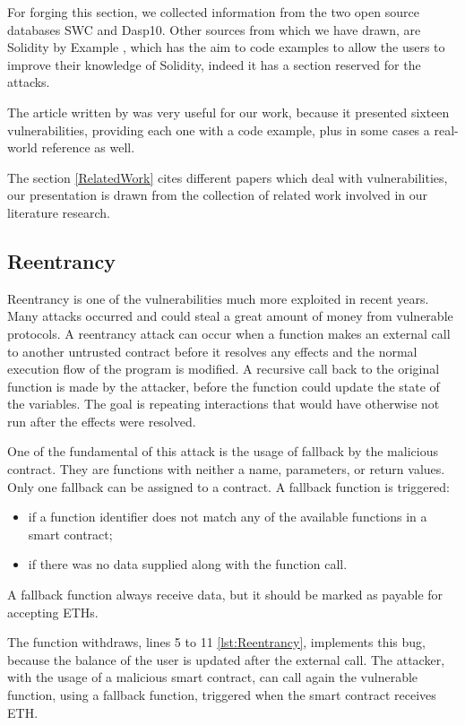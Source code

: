 \documentclass[a4paper,sigconf, language=french,
language=german, language=spanish, language=english]{acmart}
\begin{document}
For forging this section, we collected information from the two open source databases SWC and Dasp10. Other sources from which we have drawn, 
are Solidity by Example \cite{SolidityExamples}, 
which has the aim to code examples to allow the users to improve their knowledge of Solidity, indeed it has a section reserved for the attacks. 

The article written by \citet{VulnMedium} was very useful for our work, because it presented sixteen vulnerabilities, providing each one with a code example, plus in some cases a real-world reference as well.

The section \autoref{RelatedWork} cites different papers which deal with vulnerabilities, our presentation is drawn from the collection of related work involved in our literature research. 

\subsection{Reentrancy} 
Reentrancy is one of the vulnerabilities much more exploited in recent years. 
Many attacks occurred and could steal a great amount of money from vulnerable protocols. 
A reentrancy attack can occur when a function makes an external call to another untrusted contract before it resolves any effects and the normal execution flow of the program is modified.
A recursive call back to the original function is made by the attacker, before 
the function could update the state of the variables. 
The goal is repeating interactions that would have otherwise not run after the effects were resolved. 

One of the fundamental of this attack is the usage of fallback by the malicious contract. 
They are functions with neither a name, parameters, or return values. Only one fallback can be assigned to a contract. 
A fallback function is triggered:
\begin{itemize}
  \item if a function identifier does not match any of the available functions in a smart contract;
  \item if there was no data supplied along with the function call.
\end{itemize}

A fallback function always receive data, but it should be marked as payable for accepting ETHs. 

The function withdraws, lines 5 to 11 \autoref{lst:Reentrancy}, implements this bug, because the balance of the user is updated after the external call. 
The attacker, with the usage of a malicious smart contract, can call again the vulnerable function, using a fallback function, triggered when the smart contract receives ETH. 
\end{document}
